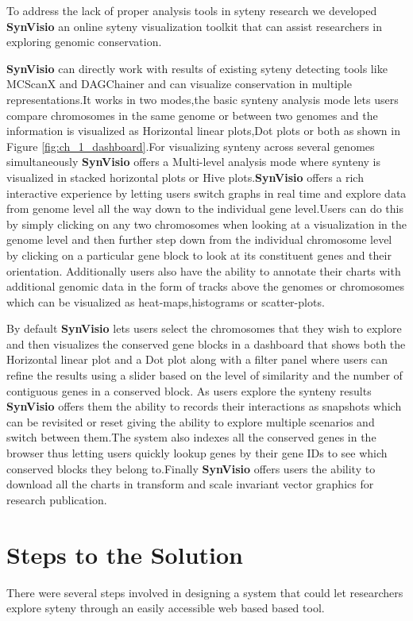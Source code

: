 To address the lack of proper analysis tools in syteny research we developed \textbf{SynVisio} an online syteny visualization toolkit that can assist researchers in exploring genomic conservation.

\textbf{SynVisio} can directly work with results of existing syteny detecting tools like MCScanX and DAGChainer and can visualize conservation in multiple representations.It works in two modes,the basic synteny analysis mode lets users compare chromosomes in the same genome or between two genomes and the information is visualized as Horizontal linear plots,Dot plots or both as shown in Figure \ref{fig:ch_1_dashboard}.For visualizing synteny across several genomes simultaneously \textbf{SynVisio} offers a Multi-level analysis mode where synteny is visualized in stacked horizontal plots or Hive plots.\textbf{SynVisio} offers a rich interactive experience by letting users switch graphs in real time and explore data from genome level all the way down to the individual gene level.Users can do this by simply clicking on any two chromosomes when looking at a visualization in the genome level and then further step down from the individual chromosome level by clicking on a particular gene block to look at its constituent  genes and their orientation. Additionally users also have the ability to annotate their charts with additional genomic data in the form of tracks above the genomes or chromosomes which can be visualized as heat-maps,histograms or scatter-plots.



By default \textbf{SynVisio} lets users select the chromosomes that they wish to explore and then visualizes the conserved gene blocks in a dashboard that shows both the Horizontal linear plot and a Dot plot along with a filter panel where users can refine the results using a slider based on the level of similarity and the number of contiguous genes in a conserved block.
As users explore the synteny results \textbf{SynVisio} offers them the ability to records their interactions as snapshots which can be revisited or reset giving the ability to explore multiple scenarios and switch between them.The system also indexes all the conserved genes in the browser thus letting users quickly lookup genes by their gene IDs to see which conserved blocks they belong to.Finally \textbf{SynVisio} offers users the ability to download all the charts in transform and scale invariant vector graphics for research publication.

\section{Steps to the Solution} 
There were several steps involved in designing a system that could let researchers explore syteny through an easily accessible web based based tool.

